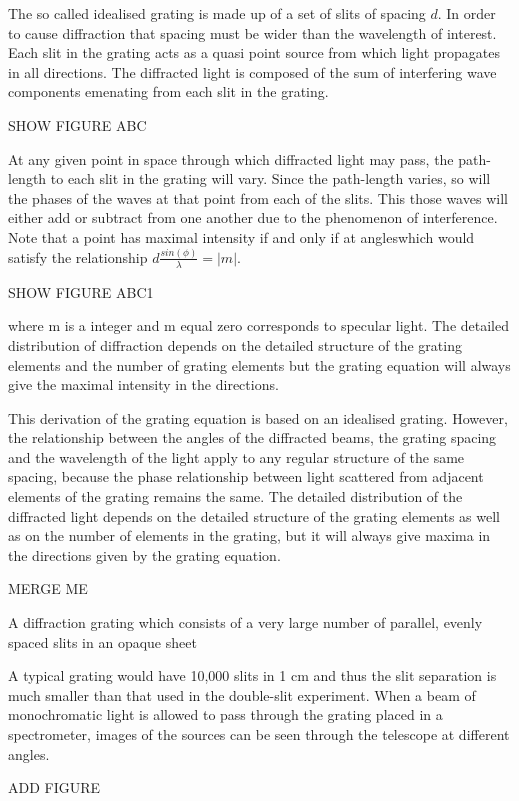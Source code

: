 The so called idealised grating is made up of a set of slits of spacing $d$. In order to cause diffraction that spacing must be wider than the wavelength of interest. Each slit in the grating acts as a quasi point source from which light propagates in all directions. The diffracted light is composed of the sum of interfering wave components emenating from each slit in the grating. 

SHOW FIGURE ABC

At any given point in space through which diffracted light may pass, the path-length to each slit in the grating will vary. Since the path-length varies, so will the phases of the waves at that point from each of the slits. This those waves will either add or subtract from one another due to the phenomenon of interference. Note that a point has maximal intensity if and only if at angleswhich would satisfy the relationship $d \frac{sin(\phi)}{\lambda} = |m|$. 

SHOW FIGURE ABC1

where m is a integer and m equal zero corresponds to specular light. 
The detailed distribution of diffraction depends on the detailed structure of the grating elements and the number of grating elements but the grating equation will always give the maximal intensity in the directions.

This derivation of the grating equation is based on an idealised grating. However, the relationship between the angles of the diffracted beams, the grating spacing and the wavelength of the light apply to any regular structure of the same spacing, because the phase relationship between light scattered from adjacent elements of the grating remains the same. The detailed distribution of the diffracted light depends on the detailed structure of the grating elements as well as on the number of elements in the grating, but it will always give maxima in the directions given by the grating equation.


MERGE ME

A diffraction grating which consists of a very large number of parallel, evenly spaced slits in an opaque sheet

A typical grating would have 10,000 slits in 1 cm and thus the slit separation is much smaller than that used in the double-slit experiment. When a beam of monochromatic light is allowed to pass through the grating placed in a spectrometer, images of the sources can be seen through the telescope at different angles.

ADD FIGURE

